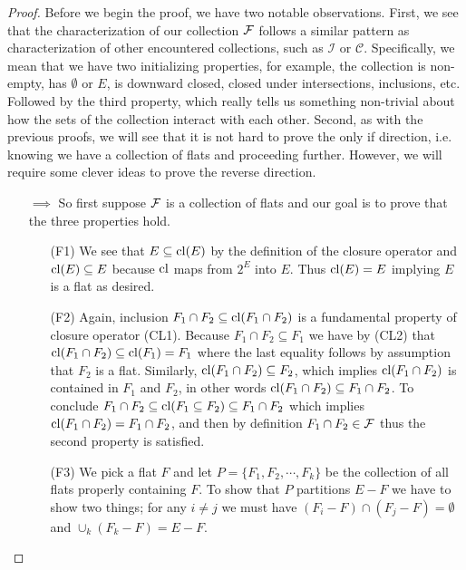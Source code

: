 \begin{proof}
Before we begin the proof, we have two notable observations. First, we see that the characterization of our collection $\mathcal{F}$ follows a similar pattern as characterization of other encountered collections, such as $\mathcal{I}$ or $\mathcal{C}$. Specifically, we mean that we have two initializing properties, for example, the collection is non-empty, has $\emptyset$ or $E$, is downward closed, closed under intersections, inclusions, etc. Followed by the third property, which really tells us something non-trivial about how the sets of the collection interact with each other. 
Second, as with the previous proofs, we will see that it is not hard to prove the only if direction, i.e. knowing we have a collection of flats and proceeding further. However, we will require some clever ideas to prove the reverse direction.

\begin{enumerate}
     
\item[$\implies$]
So first suppose $\mathcal{F}$ is a collection of flats and our goal is to prove that the three properties hold. 

\begin{enumerate}
    \item[(F1)] We see that $E \subseteq \mathrm{cl}(E)$ by the definition of the closure operator and $\mathrm{cl}(E)\subseteq E$ because $\mathrm{cl}$ maps from $2^E$ into $E.$ Thus $\mathrm{cl}(E)= E$ implying $E$ is a flat as desired.
    
    \item[(F2)] Again, inclusion $F_1 \cap F_2 \subseteq \mathrm{cl}(F_1 \cap F_2)$ is a fundamental property of closure operator (CL1). Because $F_1 \cap F_2 \subseteq F_1$ we have by (CL2) that $\mathrm{cl}(F_1 \cap F_2) \subseteq \mathrm{cl}(F_1) = F_1$ where the last equality follows by assumption that $F_2$ is a flat. Similarly, $\mathrm{cl}(F_1\cap F_2) \subseteq F_2$, which implies $\mathrm{cl}(F_1\cap F_2)$ is contained in $F_1$ and $F_2$, in other words $\mathrm{cl}(F_1 \cap F_2) \subseteq F_1 \cap F_2$. To conclude $F_1 \cap F_2 \subseteq \mathrm{cl}(F_1 \subseteq F_2) \subseteq F_1 \cap F_2$ which implies $\mathrm{cl}(F_1 \cap F_2) = F_1 \cap F_2$, and then by definition $F_1 \cap F_2 \in \mathcal{F}$ thus the second property is satisfied.

    \item[(F3)] We pick a flat $F$ and let $P = \{F_1, F_2, \cdots, F_k\}$ be the collection of all flats properly containing $F$. To show that $P$ partitions $E - F$ we have to show two things; for any $i \neq j$ we must have $(F_i - F)\cap( F_j - F) = \emptyset$ and $\cup_{k}( F_k - F) = E - F.$ 
    

\end{enumerate}
\end{enumerate}
\end{proof}
